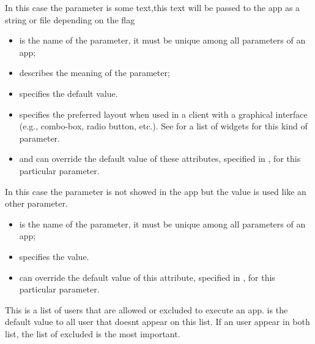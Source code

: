 \bigskip
{}
{In this case the parameter is some text,this text will be passed to the app as a string or file depending on the flag 

\begin{itemize}
  \item {} is the name of the parameter, it must be
    unique among all parameters of an app;

  \item {} describes the meaning of the parameter;

  \item {} specifies the default
    value.

  \item {} specifies the preferred layout when
    used in a client with a graphical interface (e.g., combo-box,
    radio button, etc.). See  for a list of
    widgets for this kind of parameter.
\item {} and  can override the default value of these attributes, specified in , for this particular parameter.
  \end{itemize}
}{}

\bigskip
{}
{In this case the parameter is not showed in the app but the value is
  used like an other parameter.

\begin{itemize}
  \item {} is the name of the parameter, it must be
    unique among all parameters of an app;

  \item {} specifies the value.

\item {} can override the default value of this attribute, specified in , for this particular parameter.
  \end{itemize}}
{}

\bigskip
{}
{This is a list of users that are allowed or excluded to execute an
  app.  is the default value to all user that
  doesnt appear on this list. If an user appear in both list, the list
of excluded is the most important.}
{}

